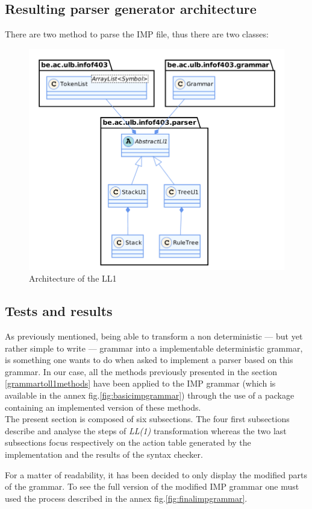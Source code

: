 \documentclass[a4paper,11pt]{article}
\begin{document}
  \subsection{Resulting parser generator architecture}
    There are two method to parse the IMP file, thus there are two classes:
    \begin{figure}[h!]
      \centering
      \includegraphics[width=\textwidth]{./img/class_ll1.png}
      \caption{Architecture of the LL1}
      \label{fig:architecturell1}
    \end{figure}
  
  \subsection{Tests and results}
    \label{sec:results}
    As previously mentioned, being able to transform a non deterministic --- but yet rather simple to write --- grammar into a implementable deterministic grammar, is something one wants to do when asked to implement a parser based on this grammar. In our case, all the methods previously presented in the section \ref{grammartoll1methods} have been applied to the IMP grammar (which is available in the annex fig.\ref{fig:basicimpgrammar}) through the use of a package containing an implemented version of these methods.\\
    The present section is composed of six subsections. The four first subsections describe and analyse the steps of \textit{LL(1)} transformation whereas the two last subsections focus respectively on the action table generated by the implementation and the results of the syntax checker.\\
    \begin{tcolorbox}
      For a matter of readability, it has been decided to only display the modified parts of the grammar. To see the full version of the modified IMP grammar one must used the process described in the annex fig.\ref{fig:finalimpgrammar}.
    \end{tcolorbox}
    
\end{document}
